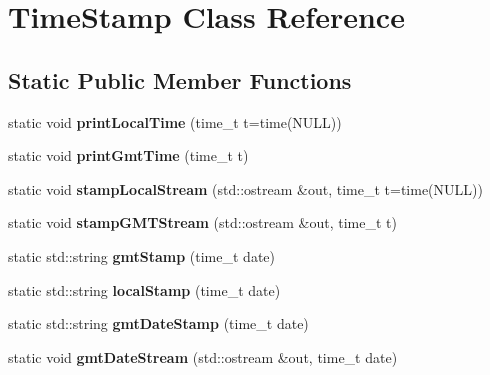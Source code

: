 \hypertarget{classTimeStamp}{
\section{TimeStamp Class Reference}
\label{classTimeStamp}
}
\subsection*{Static Public Member Functions}
\begin{DoxyCompactItemize}
\item 
\hypertarget{classTimeStamp_a8ec4dfa2498f47685c3f8f72b426316c}{
static void {\bfseries printLocalTime} (time\_\-t t=time(NULL))}
\label{classTimeStamp_a8ec4dfa2498f47685c3f8f72b426316c}

\item 
\hypertarget{classTimeStamp_aa7c7e41c3c0b18eccf14e82893d61474}{
static void {\bfseries printGmtTime} (time\_\-t t)}
\label{classTimeStamp_aa7c7e41c3c0b18eccf14e82893d61474}

\item 
\hypertarget{classTimeStamp_af4050fd9a42f1164f08228896182c037}{
static void {\bfseries stampLocalStream} (std::ostream \&out, time\_\-t t=time(NULL))}
\label{classTimeStamp_af4050fd9a42f1164f08228896182c037}

\item 
\hypertarget{classTimeStamp_a6488a89f147c3ad756b8a1669d02e121}{
static void {\bfseries stampGMTStream} (std::ostream \&out, time\_\-t t)}
\label{classTimeStamp_a6488a89f147c3ad756b8a1669d02e121}

\item 
\hypertarget{classTimeStamp_a0f124a90bd8126f4d4db39d8cb40bd45}{
static std::string {\bfseries gmtStamp} (time\_\-t date)}
\label{classTimeStamp_a0f124a90bd8126f4d4db39d8cb40bd45}

\item 
\hypertarget{classTimeStamp_a7be3a73ce893276376f96a74e7add043}{
static std::string {\bfseries localStamp} (time\_\-t date)}
\label{classTimeStamp_a7be3a73ce893276376f96a74e7add043}

\item 
\hypertarget{classTimeStamp_aaf0342f4746a70a9833d1b2820a5cc92}{
static std::string {\bfseries gmtDateStamp} (time\_\-t date)}
\label{classTimeStamp_aaf0342f4746a70a9833d1b2820a5cc92}

\item 
\hypertarget{classTimeStamp_a58075740c3ec523129da01723839c409}{
static void {\bfseries gmtDateStream} (std::ostream \&out, time\_\-t date)}
\label{classTimeStamp_a58075740c3ec523129da01723839c409}


\end{DoxyCompactItemize}
